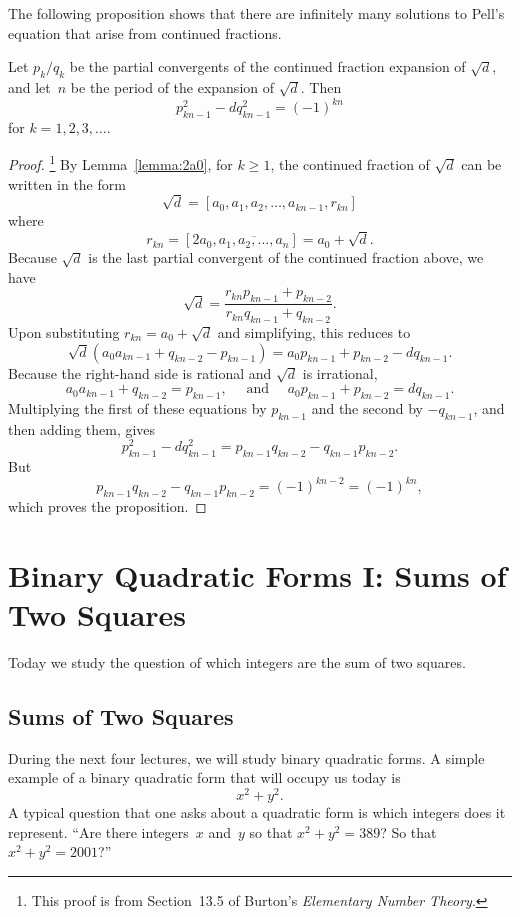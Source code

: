 \documentclass[11pt]{report}
\begin{document}
The following proposition shows that there are infinitely many
solutions to Pell's equation that arise from continued fractions.
\begin{proposition}
  Let $p_k/q_k$ be the partial convergents of the continued fraction
  expansion of $\sqrt{d}$, and let~$n$ be the period of the expansion
  of $\sqrt{d}$.  Then
  $$p_{kn-1}^2 - d q_{kn-1}^2 = (-1)^{kn}$$
  for $k=1,2,3,\ldots$.
\end{proposition}
\begin{proof}\footnote{This proof is from Section~13.5 of Burton's {\em Elementary Number Theory}.}
  By Lemma~\ref{lemma:2a0},
  for $k\geq 1$, the continued fraction of $\sqrt{d}$ can be written
  in the form
  $$\sqrt{d} = [a_0, a_1, a_2, \ldots, a_{kn-1}, r_{kn}]$$
  where
  $$r_{kn} = [2a_0, \overline{a_1, a_2, \ldots, a_{n}}] = a_0 + \sqrt{d}.$$
  Because $\sqrt{d}$ is the last partial convergent of the continued fraction
  above, we have
  $$
    \sqrt{d} = \frac{r_{kn} p_{kn-1} + p_{kn-2}}{r_{kn} q_{kn-1} + q_{kn-2}}.
  $$
  Upon substituting $r_{kn} = a_0 + \sqrt{d}$ and simplifying, this reduces
  to
  $$\sqrt{d}(a_0 a_{kn-1} + q_{kn-2} - p_{kn-1})
    = a_0 p_{kn-1} + p_{kn-2} - d q_{kn-1}.$$
  Because the right-hand side is rational and $\sqrt{d}$ is irrational,
  $$a_0 a_{kn-1} + q_{kn-2} = p_{kn-1},
    \quad\text{ and }\quad
    a_0 p_{kn-1} + p_{kn-2} = d q_{kn-1}.$$
  Multiplying the first of these equations by $p_{kn-1}$
  and the second by $-q_{kn-1}$, and then adding them, gives
  $$
    p_{kn-1}^2 - d q_{kn-1}^2 = p_{kn-1}q_{kn-2} - q_{kn-1} p_{kn-2}.$$
  But
  $$
    p_{kn-1}q_{kn-2} - q_{kn-1} p_{kn-2} = (-1)^{kn-2} = (-1)^{kn},
  $$
  which proves the proposition.
\end{proof}







\chapter{Binary Quadratic Forms I: Sums of Two Squares}


Today we study the question of which integers are the sum of two squares.

\section{Sums of Two Squares}
During the next four lectures, we will study binary quadratic forms.
A simple example of a binary quadratic form that will occupy us today is
$$
  x^2 + y^2.
$$
A typical question that one asks about a quadratic form is which
integers does it represent.  ``Are there integers~$x$ and~$y$
so that $x^2 + y^2 = 389$?  So that $x^2 + y^2 = 2001$?''
\end{document}
